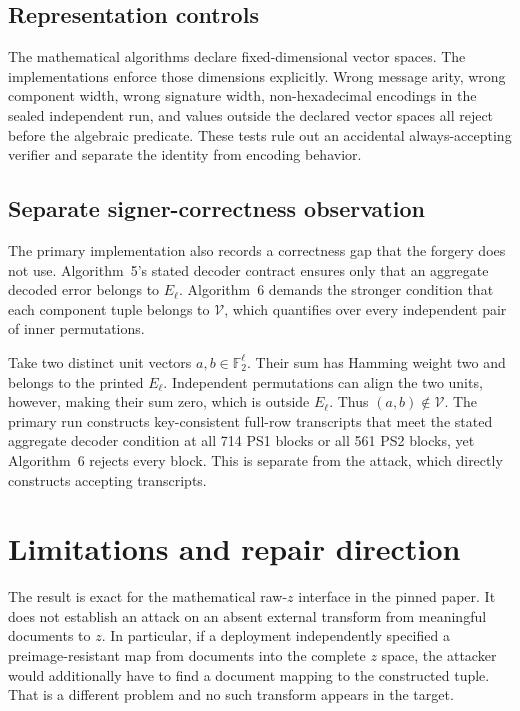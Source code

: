 \documentclass[10pt,a4paper]{article}
\newcommand{\F}{\mathbb{F}}
\newcommand{\VES}{\mathcal{V}}
\begin{document}
\subsection{Representation controls}

The mathematical algorithms declare fixed-dimensional vector spaces.  The
implementations enforce those dimensions explicitly.  Wrong message arity,
wrong component width, wrong signature width, non-hexadecimal encodings in
the sealed independent run, and values outside the declared vector spaces all
reject before the algebraic predicate.  These tests rule out an accidental
always-accepting verifier and separate the identity from encoding behavior.

\subsection{Separate signer-correctness observation}

The primary implementation also records a correctness gap that the forgery
does not use.  Algorithm~5's stated decoder contract ensures only that an
aggregate decoded error belongs to $E_\ell$.  Algorithm~6 demands the stronger
condition that each component tuple belongs to $\VES$, which quantifies over
every independent pair of inner permutations.

Take two distinct unit vectors $a,b\in\F_2^\ell$.  Their sum has Hamming
weight two and belongs to the printed $E_\ell$.  Independent permutations can
align the two units, however, making their sum zero, which is outside
$E_\ell$.  Thus $(a,b)\notin\VES$.  The primary run constructs key-consistent
full-row transcripts that meet the stated aggregate decoder condition at all
714 PS1 blocks or all 561 PS2 blocks, yet Algorithm~6 rejects every block.
This is separate from the attack, which directly constructs accepting
transcripts.

\section{Limitations and repair direction}

The result is exact for the mathematical raw-$z$ interface in the pinned
paper.  It does not establish an attack on an absent external transform from
meaningful documents to $z$.  In particular, if a deployment independently
specified a preimage-resistant map from documents into the complete $z$
space, the attacker would additionally have to find a document mapping to the
constructed tuple.  That is a different problem and no such transform appears
in the target.
\end{document}
